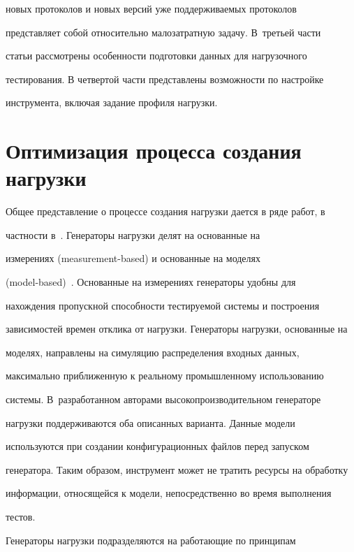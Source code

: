 новых протоколов и новых версий уже поддерживаемых протоколов


представляет собой относительно малозатратную задачу. В~третьей части


статьи рассмотрены особенности подготовки данных для нагрузочного


тестирования. В четвертой части представлены возможности по настройке


инструмента, включая задание профиля нагрузки.





\section{Оптимизация процесса создания нагрузки}





  Общее представление о процессе создания нагрузки дается в ряде работ, в


частности в~\cite{9-g}. Генераторы нагрузки делят на основанные на


измерениях (measurement-based) и основанные на моделях


(model-based)~\cite{10-g}. Основанные на измерениях генераторы удобны для


нахождения пропускной способности тестируемой системы и построения


зависимостей времен отклика от нагрузки. Генераторы нагрузки, основанные на


моделях, направлены на симуляцию распределения входных данных,


максимально приближенную к реальному промышленному использованию


системы. В~разработанном авторами высокопроизводительном генераторе


нагрузки поддерживаются оба описанных варианта. Данные модели


используются при создании конфигурационных файлов перед запуском


генератора. Таким образом, инструмент может не тратить ресурсы на обработку


информации, относящейся к модели, непосредственно во время выполнения


тестов.





  Генераторы нагрузки подразделяются на работающие по принципам



